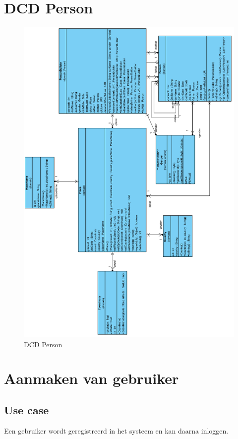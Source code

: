 \documentclass[pdftex,a4paper,12pt,twoside]{report}
\begin{document}
\section{DCD Person}
\begin{figure}[!htb]
\includegraphics[width=\textwidth, height=\textheight]{images/DCDpersondomain.png}
\caption{DCD Person}
\end{figure}

\section{Aanmaken van gebruiker}
\subsection{Use case}
Een gebruiker wordt geregistreerd in het systeem en kan daarna inloggen.
\end{document}
